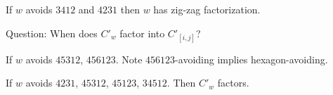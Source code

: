 \begin{theorem}
	If $w$ avoids $3412$ and $4231$ then $w$ has zig-zag factorization.
\end{theorem}

Question: When does $C'_w$ factor into $C'_{[i,j]}$?
\begin{conj}
	If $w$ avoids $45312$, $456123$. Note $456123$-avoiding implies hexagon-avoiding.
\end{conj}

\begin{theorem}
	If $w$ avoids $4231$, $45312$, $45123$, $34512$. Then $C'_w$ factors.
\end{theorem}
